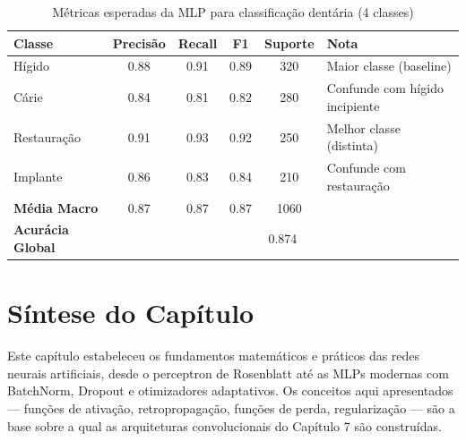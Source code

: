 \begin{table}[H]
  \centering
  \caption{Métricas esperadas da MLP para classificação dentária (4 classes)}
  \label{tab:mlp-results}
  \begin{tabularx}{\textwidth}{lccccX}
    \toprule
    \textbf{Classe} & \textbf{Precisão} & \textbf{Recall} & \textbf{F1} & \textbf{Suporte} & \textbf{Nota} \\
    \midrule
    Hígido & 0.88 & 0.91 & 0.89 & 320 & Maior classe (baseline) \\
    Cárie & 0.84 & 0.81 & 0.82 & 280 & Confunde com hígido incipiente \\
    Restauração & 0.91 & 0.93 & 0.92 & 250 & Melhor classe (distinta) \\
    Implante & 0.86 & 0.83 & 0.84 & 210 & Confunde com restauração \\
    \midrule
    \textbf{Média Macro} & 0.87 & 0.87 & 0.87 & 1060 & \\
    \textbf{Acurácia Global} & \multicolumn{5}{c}{0.874} \\
    \bottomrule
  \end{tabularx}
\end{table}



\section{Síntese do Capítulo}
\label{sec:sintese-06}

Este capítulo estabeleceu os fundamentos matemáticos e práticos das redes neurais
artificiais, desde o perceptron de Rosenblatt até as MLPs modernas com BatchNorm,
Dropout e otimizadores adaptativos. Os conceitos aqui apresentados --- funções de
ativação, retropropagação, funções de perda, regularização --- são a base sobre a
qual as arquiteturas convolucionais do Capítulo 7 são construídas.


